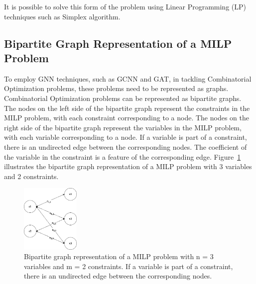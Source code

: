 It is possible to solve this form of the problem using Linear Programming (LP) techniques such as Simplex algorithm.


\subsection{Bipartite Graph Representation of a MILP Problem}
\label{sec:bipartite_graph_representation}
To employ GNN techniques, such as GCNN and GAT, in tackling Combinatorial Optimization problems, these problems need to be represented as graphs.
Combinatorial Optimization problems can be represented as bipartite graphs.
The nodes on the left side of the bipartite graph represent the constraints in the MILP problem, with each constraint corresponding to a node.
The nodes on the right side of the bipartite graph represent the variables in the MILP problem, with each variable corresponding to a node.
If a variable is part of a constraint, there is an undirected edge between the corresponding nodes.
The coefficient of the variable in the constraint is a feature of the corresponding edge.
Figure~\ref{fig:biparite-graph} illustrates the bipartite graph representation of a MILP problem with 3 variables and 2 constraints.

\begin{figure}[htb!]
    \centering
    \includegraphics[width=0.25\textwidth]{figures/Bipartite Graph.drawio}
    \caption{Bipartite graph representation of a MILP problem with n = 3 variables and m = 2 constraints. If a variable is part of a constraint, there is an undirected edge between the corresponding nodes.}
    \label{fig:biparite-graph}
\end{figure}

